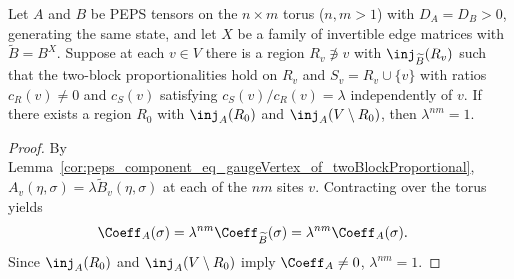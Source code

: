 \begin{corollary}%
    \label{cor:peps_lambda_pow_card_torus_eq_one_of_twoBlockProportional}
    \leanok
    Let $A$ and $B$ be PEPS tensors on the $n\times m$ torus ($n,m>1$) with
    $D_A=D_B>0$, generating the same state, and let $X$ be a family of
    invertible edge matrices with $\widetilde B=B^X$. Suppose at each $v\in V$
    there is a region $R_v\not\ni v$ with $\inj_{\widetilde B}(R_v)$ such that
    the two-block proportionalities hold on $R_v$ and $S_v=R_v\cup\{v\}$ with
    ratios $c_R(v)\ne 0$ and $c_S(v)$ satisfying $c_S(v)/c_R(v)=\lambda$
    independently of $v$. If there exists a region $R_0$ with $\inj_A(R_0)$ and
    $\inj_A(V\setminus R_0)$, then $\lambda^{nm}=1$.
\end{corollary}
\begin{proof}\leanok
    By Lemma~\ref{cor:peps_component_eq_gaugeVertex_of_twoBlockProportional},
    $A_v(\eta,\sigma)=\lambda\widetilde B_v(\eta,\sigma)$ at each of the $nm$
    sites $v$. Contracting over the torus yields
    \begin{align}
        \Coeff_A(\sigma)
         & =
        \lambda^{nm}\Coeff_{\widetilde B}(\sigma)
        =\lambda^{nm}\Coeff_A(\sigma).
        \notag
    \end{align}
    Since $\inj_A(R_0)$ and $\inj_A(V\setminus R_0)$ imply $\Coeff_A\ne 0$,
    $\lambda^{nm}=1$.
\end{proof}

